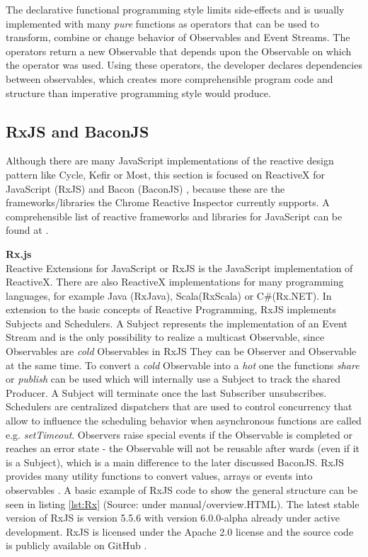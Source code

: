	The declarative functional programming style limits side-effects and is usually implemented with many \emph{pure} functions as operators that can be used to transform, combine or change behavior of Observables and Event Streams. The operators return a new Observable that depends upon the Observable on which the operator was used. Using these operators, the developer declares dependencies between observables, which creates more comprehensible program code and structure \cite[Why Reactive Programming?]{ReactiveInspector} than imperative programming style would produce. 
	

	\subsection{RxJS and BaconJS}
	Although there are many JavaScript implementations of the reactive design pattern like Cycle\cite{CycleJS}, Kefir\cite{KefirJS} or  Most\cite{MostJS}, this section is focused on ReactiveX for JavaScript (RxJS) \cite{RxJs} and Bacon (BaconJS) \cite{BaconJS}, because these are the frameworks/libraries the Chrome Reactive Inspector currently supports. A comprehensible list of reactive frameworks and libraries for JavaScript can be found at \cite{FRPJSList}.
	
	\textbf{Rx.js}\\
	Reactive Extensions for JavaScript or RxJS is the JavaScript implementation of ReactiveX. There are also ReactiveX implementations for many programming languages, for example Java (RxJava), Scala(RxScala) or C\#(Rx.NET). In extension to the basic concepts of Reactive Programming, RxJS implements Subjects and Schedulers. A Subject represents the implementation of an Event Stream and is the only possibility to realize a multicast Observable, since Observables are \emph{cold} Observables in RxJS They can be Observer and Observable at the same time. To convert a \emph{cold} Observable into a \emph{hot} one the functions \emph{share} or \emph{publish} can be used which will internally use a Subject to track the shared Producer. A Subject will terminate once the last Subscriber unsubscribes. Schedulers are centralized dispatchers that are used to control concurrency that allow to influence the scheduling behavior when asynchronous functions are called e.g. \emph{setTimeout}\cite{RxJsDocu}.
	Observers raise special events if the Observable is completed or reaches an error state - the Observable will not be reusable after wards (even if it is a Subject), which is a main difference to the later discussed BaconJS. RxJS provides many utility functions to convert values, arrays or events into observables \cite{ThesisBaradur}. A basic example of RxJS code to show the general structure can be seen in listing \ref{lst:Rx} (Source: \cite{RxJsDocu} under manual/overview.HTML).
	The latest stable version of RxJS is version 5.5.6 with version 6.0.0-alpha already under active development. RxJS is licensed under the Apache 2.0 license and the source code is publicly available on GitHub \cite{RxJs}.

